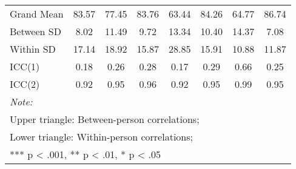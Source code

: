 \begin{table}
\begin{minipage}[t][\textheight][t]{\textwidth}
{\begin{tabular}[t]{lccccccc}
\addlinespace
\hspace{1em}Grand Mean & 83.57 & 77.45 & 83.76 & 63.44 & 84.26 & 64.77 & 86.74\\
\hspace{1em}Between SD & 8.02 & 11.49 & 9.72 & 13.34 & 10.40 & 14.37 & 7.08\\
\hspace{1em}Within SD & 17.14 & 18.92 & 15.87 & 28.85 & 15.91 & 10.88 & 11.87\\
\hspace{1em}ICC(1) & 0.18 & 0.26 & 0.28 & 0.17 & 0.29 & 0.66 & 0.25\\
\hspace{1em}ICC(2) & 0.92 & 0.95 & 0.96 & 0.92 & 0.95 & 0.99 & 0.95\\
\bottomrule
\multicolumn{8}{l}{\rule{0pt}{1em}\textit{Note: }}\\
\multicolumn{8}{l}{\rule{0pt}{1em}Upper triangle: Between-person correlations;}\\
\multicolumn{8}{l}{\rule{0pt}{1em}Lower triangle: Within-person correlations;}\\
\multicolumn{8}{l}{\rule{0pt}{1em}*** p < .001, ** p < .01,  * p < .05}\\
\end{tabular}}
\end{minipage}
\end{table}
